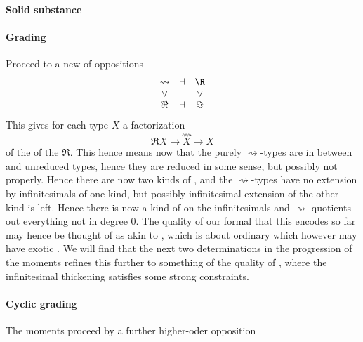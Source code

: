 \hypertarget{solid_substance}{}\paragraph*{{Solid substance}}\label{solid_substance}
\hypertarget{Grading}{}\paragraph*{{Grading}}\label{Grading}
Proceed to a new  of oppositions
\begin{displaymath}
\itexarray{
\rightsquigarrow &\dashv& \R
\\
\vee && \vee
\\
\Re &\dashv& \Im
}
\end{displaymath}
This gives for each type $X$ a factorization
\begin{displaymath}
\Re X \longrightarrow \stackrel{\rightsquigarrow}{X} \longrightarrow X
\end{displaymath}
of the  of the  $\Re$.
This hence means now that the purely $\rightsquigarrow$-types are in between  and unreduced types, hence they are reduced in some sense, but possibly not properly. Hence there are now two kinds of , and the $\rightsquigarrow$-types have no extension by infinitesimals of one kind, but possibly infinitesimal extension of the other kind is left.
Hence there is now a kind of  on the infinitesimals and $\rightsquigarrow$ quotients out everything not in degree 0.
The  quality of our formal  that this encodes so far may hence be thought of as akin to , which is about ordinary  which however may have exotic  . We will find that the next two determinations in the progression of the moments refines this further to something of the quality of , where the infinitesimal thickening satisfies some strong constraints.
\hypertarget{cyclic_grading}{}\paragraph*{{Cyclic grading}}\label{cyclic_grading}
The moments proceed by a further higher-oder opposition
